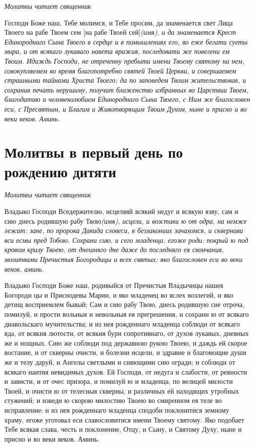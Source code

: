 \itshape Молитвы читает священник\normalfont{}

Господи Боже наш, Тебе молимся, и Тебе просим, да знаменается свет Лица Твоего на рабе Твоем сем [на рабе Твоей сей]\itshape  (имя)\normalfont{}, и да знаменается Крест Единороднаго Сына Твоего в сердце и в помышлениях его, во еже бегати суеты мира, и от всякаго лукаваго навета вражия, последовати же повелени ем Твоим. Идаждь Господи, не отреченну пребыти имени Твоему святому на нем, совокупляемем во время благопотребно святей Твоей Церкви, и совершаемем страшными тайнами Христа Твоего; да по заповедем Твоим жительствовав, и сохранив печать нерушиму, получит блаженство избранных во Царствии Твоем, благодатию и человеколюбием Единороднаго Сына Твоего, с Ним же благословен еси, с Пресвятым, и Благим и Животворящим Твоим Духом, ныне и присно и во веки веков. Аминь. 


\section{Молитвы в первый день по рождению дитяти}
 


\itshape Молитвы читает священник\normalfont{}

Владыко Господи Вседержителю, исцеляяй всякий недуг и всякую язву, сам и сию днесь родившую рабу Твою\itshape  (имя)\normalfont{}, исцели, и возстави ю от одра, на немже лежит: зане, по пророка Давида словеси, в беззакониих зачахомся, и сквернави вси есмы пред Тобою. Сохрани сию, и сего младенца, егоже роди: покрый ю под кровом крилу Твоею, от днешняго дне даже до последняго ея скончания, молитвами Пречистыя Богородицы и всех святых; яко благословен еси во веки веков, аминь. 


Владыко Господи Боже наш, родивыйся от Пречистыя Владычицы нашея Богороди цы и Приснодевы Марии, и яко младенец во яслех возлегий, и яко детищ восприемлем бывый; Сам и сию рабу Твою, днесь родившую сие отроча, помилуй, и прости вольныя и невольныя ея прегрешения, и сохрани ю от всякаго диавольскаго мучительства; и из нея рожденнаго младенца соблюди от всякаго яда, от всякия лютости, от всякия бури сопротивнаго, от духов лукавых, дневных же и нощных. Сию же соблюди под державною рукою Твоею, и даждь ей скорое востание, и от скверны очисти, и болезни исцели, и здравие и благомощие души же и телу даруй, и Ангелы светлыми и сияющими сию огради; и соблюди от всякаго наития невидимых духов. Ей Господи, от недуга и слабости, от ревности и зависти, и от очес призора, и помилуй ю и младенца, по велицей милости Твоей, и очисти ю от телесныя скверны, и различных ей находящих утробных стужений; и изведи ю скорою милостию Твоею во смиренном ея теле во исправление: и из нея рожденнаго младенца сподоби поклонитися земному храму, егоже уготовал еси славословитися имени Твоему святому. Яко подобает Тебе всякая слава, честь и поклонение, Отцу, и Сыну, и Святому Духу, ныне и присно и во веки веков. Аминь.  



